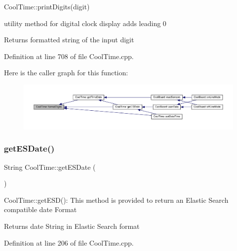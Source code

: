Cool\+Time\+::print\+Digits(digit)

utility method for digital clock display adds leading 0

\begin{DoxyReturn}{Returns}
formatted string of the input digit 
\end{DoxyReturn}


Definition at line 708 of file Cool\+Time.\+cpp.

Here is the caller graph for this function\+:\nopagebreak
\begin{figure}[H]
\begin{center}
\leavevmode
\includegraphics[width=350pt]{class_cool_time_acd537cd4210d7bde4e1f5c47d2ac0456_icgraph}
\end{center}
\end{figure}
\mbox{\label{class_cool_time_ac4f32ee513c1328d984306645e8785a4}} 
\subsubsection{\texorpdfstring{get\+E\+S\+Date()}{getESDate()}}
{\footnotesize\ttfamily String Cool\+Time\+::get\+E\+S\+Date (\begin{DoxyParamCaption}{ }\end{DoxyParamCaption})}

Cool\+Time\+::get\+E\+S\+D()\+: This method is provided to return an Elastic Search compatible date Format

\begin{DoxyReturn}{Returns}
date String in Elastic Search format 
\end{DoxyReturn}


Definition at line 206 of file Cool\+Time.\+cpp.

